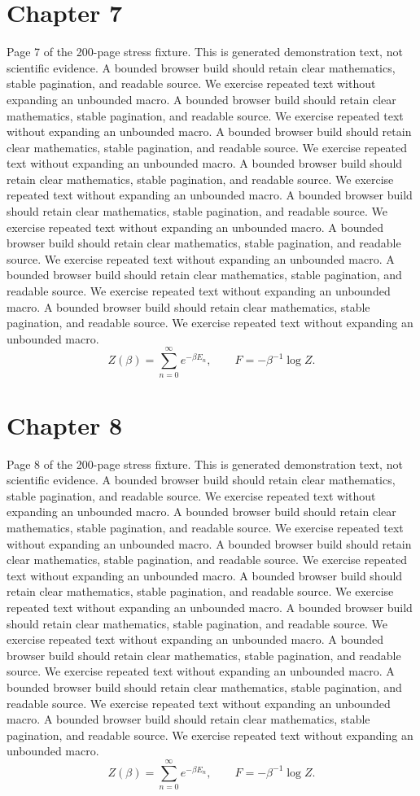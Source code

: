 \documentclass[11pt]{article}
\begin{document}
\section*{Chapter 7}
Page 7 of the 200-page stress fixture. This is generated demonstration text, not scientific evidence.
A bounded browser build should retain clear mathematics, stable pagination, and readable source. We exercise repeated text without expanding an unbounded macro.
A bounded browser build should retain clear mathematics, stable pagination, and readable source. We exercise repeated text without expanding an unbounded macro.
A bounded browser build should retain clear mathematics, stable pagination, and readable source. We exercise repeated text without expanding an unbounded macro.
A bounded browser build should retain clear mathematics, stable pagination, and readable source. We exercise repeated text without expanding an unbounded macro.
A bounded browser build should retain clear mathematics, stable pagination, and readable source. We exercise repeated text without expanding an unbounded macro.
A bounded browser build should retain clear mathematics, stable pagination, and readable source. We exercise repeated text without expanding an unbounded macro.
A bounded browser build should retain clear mathematics, stable pagination, and readable source. We exercise repeated text without expanding an unbounded macro.
A bounded browser build should retain clear mathematics, stable pagination, and readable source. We exercise repeated text without expanding an unbounded macro.
\[Z(\beta)=\sum_{n=0}^{\infty}e^{-\beta E_n},\qquad F=-\beta^{-1}\log Z.\]
\newpage
\section*{Chapter 8}
Page 8 of the 200-page stress fixture. This is generated demonstration text, not scientific evidence.
A bounded browser build should retain clear mathematics, stable pagination, and readable source. We exercise repeated text without expanding an unbounded macro.
A bounded browser build should retain clear mathematics, stable pagination, and readable source. We exercise repeated text without expanding an unbounded macro.
A bounded browser build should retain clear mathematics, stable pagination, and readable source. We exercise repeated text without expanding an unbounded macro.
A bounded browser build should retain clear mathematics, stable pagination, and readable source. We exercise repeated text without expanding an unbounded macro.
A bounded browser build should retain clear mathematics, stable pagination, and readable source. We exercise repeated text without expanding an unbounded macro.
A bounded browser build should retain clear mathematics, stable pagination, and readable source. We exercise repeated text without expanding an unbounded macro.
A bounded browser build should retain clear mathematics, stable pagination, and readable source. We exercise repeated text without expanding an unbounded macro.
A bounded browser build should retain clear mathematics, stable pagination, and readable source. We exercise repeated text without expanding an unbounded macro.
\[Z(\beta)=\sum_{n=0}^{\infty}e^{-\beta E_n},\qquad F=-\beta^{-1}\log Z.\]
\newpage
\end{document}
